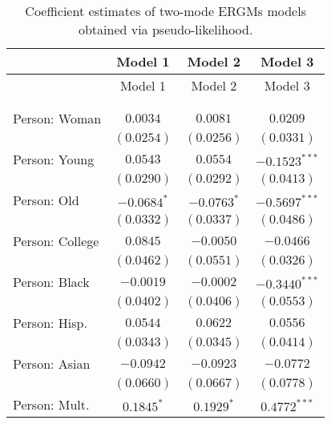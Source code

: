 
\begin{center}
\begin{longtable}{l c c c}
\toprule
 & Model 1 & Model 2 & Model 3 \\
\midrule
\endfirsthead
\toprule
 & Model 1 & Model 2 & Model 3 \\
\midrule
\endhead
\bottomrule
\endfoot
\bottomrule
\multicolumn{4}{l}{\scriptsize{$^{***}p<0.001$; $^{**}p<0.01$; $^{*}p<0.05$}}\\
\caption{Coefficient estimates of two-mode ERGMs models obtained via pseudo-likelihood.}
\label{tab:reg3}
\endlastfoot \\
Person: Woman                       & $0.0034$        & $0.0081$        & $0.0209$        \\
                                    & $(0.0254)$      & $(0.0256)$      & $(0.0331)$      \\
Person: Young                       & $0.0543$        & $0.0554$        & $-0.1523^{***}$ \\
                                    & $(0.0290)$      & $(0.0292)$      & $(0.0413)$      \\
Person: Old                         & $-0.0684^{*}$   & $-0.0763^{*}$   & $-0.5697^{***}$ \\
                                    & $(0.0332)$      & $(0.0337)$      & $(0.0486)$      \\
Person: College                     & $0.0845$        & $-0.0050$       & $-0.0466$       \\
                                    & $(0.0462)$      & $(0.0551)$      & $(0.0326)$      \\
Person: Black                       & $-0.0019$       & $-0.0002$       & $-0.3440^{***}$ \\
                                    & $(0.0402)$      & $(0.0406)$      & $(0.0553)$      \\
Person: Hisp.                       & $0.0544$        & $0.0622$        & $0.0556$        \\
                                    & $(0.0343)$      & $(0.0345)$      & $(0.0414)$      \\
Person: Asian                       & $-0.0942$       & $-0.0923$       & $-0.0772$       \\
                                    & $(0.0660)$      & $(0.0667)$      & $(0.0778)$      \\
Person: Mult.                       & $0.1845^{*}$    & $0.1929^{*}$    & $0.4772^{***}$  \\

\end{longtable}
\end{center}
